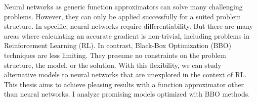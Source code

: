 
Neural networks as generic function approximators can solve many challenging problems. However, they can only be applied successfully for a suited problem structure. In specific, neural networks require differentiability. But there are many areas where calculating an accurate gradient is non-trivial, including problems in Reinforcement Learning (RL). In contrast, Black-Box Optimization (BBO) techniques are less limiting. They presume no constraints on the problem structure, the model, or the solution. With this flexibility, we can study alternative models to neural networks that are unexplored in the context of RL. This thesis aims to achieve pleasing results with a function approximator other than neural networks. I analyze promising models optimized with BBO methods.
\\
